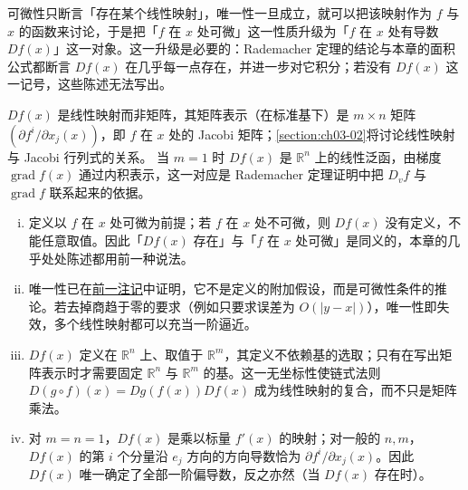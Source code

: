 \documentclass[../../main.tex]{subfiles}%
\begin{document}
\begin{remark}\label{remark:ch03-def-3-2-导数-动机}
可微性只断言「存在某个线性映射」，唯一性一旦成立，就可以把该映射作为 $f$ 与 $x$ 的函数来讨论，于是把「$f$ 在 $x$ 处可微」这一性质升级为「$f$ 在 $x$ 处有导数 $Df(x)$」这一对象。这一升级是必要的：Rademacher 定理的结论与本章的面积公式都断言 $Df(x)$ 在几乎每一点存在，并进一步对它积分；若没有 $Df(x)$ 这一记号，这些陈述无法写出。

$Df(x)$ 是线性映射而非矩阵，其矩阵表示（在标准基下）是 $m\times n$ 矩阵 $(\partial f^i/\partial x_j(x))$，即 $f$ 在 $x$ 处的 Jacobi 矩阵；\cref{section:ch03-02}将讨论线性映射与 Jacobi 行列式的关系。 当 $m=1$ 时 $Df(x)$ 是 $\mathbb{R}^n$ 上的线性泛函，由梯度 $\operatorname{grad}f(x)$ 通过内积表示，这一对应是 Rademacher 定理证明中把 $D_vf$ 与 $\operatorname{grad}f$ 联系起来的依据。 %
\end{remark}

\begin{remark}\label{remark:ch03-def-3-2-导数-条件}
\begin{enumerate}[(i)]
\item 定义以 $f$ 在 $x$ 处可微为前提；若 $f$ 在 $x$ 处不可微，则 $Df(x)$ 没有定义，不能任意取值。因此「$Df(x)$ 存在」与「$f$ 在 $x$ 处可微」是同义的，本章的几乎处处陈述都用前一种说法。
\item 唯一性已在\hyperref[remark:ch03-def-3-2-条件]{前一注记}中证明，它不是定义的附加假设，而是可微性条件的推论。若去掉商趋于零的要求（例如只要求误差为 $O(\lvert y-x\rvert)$），唯一性即失效，多个线性映射都可以充当一阶逼近。
\item $Df(x)$ 定义在 $\mathbb{R}^n$ 上、取值于 $\mathbb{R}^m$，其定义不依赖基的选取；只有在写出矩阵表示时才需要固定 $\mathbb{R}^n$ 与 $\mathbb{R}^m$ 的基。这一无坐标性使链式法则 $D(g\circ f)(x)=Dg(f(x))Df(x)$ 成为线性映射的复合，而不只是矩阵乘法。
\item 对 $m=n=1$，$Df(x)$ 是乘以标量 $f'(x)$ 的映射；对一般的 $n,m$，$Df(x)$ 的第 $i$ 个分量沿 $e_j$ 方向的方向导数恰为 $\partial f^i/\partial x_j(x)$。因此 $Df(x)$ 唯一确定了全部一阶偏导数，反之亦然（当 $Df(x)$ 存在时）。
\end{enumerate}
\end{remark}
\end{document}
